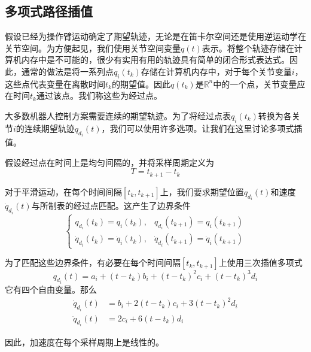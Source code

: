 \documentclass[UTF8]{ctexart}
\theoremstyle{definition}
\begin{document}
\subsection{多项式路径插值}

假设已经为操作臂运动确定了期望轨迹，无论是在笛卡尔空间还是使用逆运动学在关节空间。为方便起见，我们使用关节空间变量$q(t)$表示。将整个轨迹存储在计算机内存中是不可能的，很少有实用有用的轨迹具有简单的闭合形式表达式。因此，通常的做法是将一系列点$q_i(t_k)$存储在计算机内存中，对于每个关节变量$i$，这些点代表变量在离散时间$t_k$的期望值。因此$q(t_k)$是$\mathbb{R}^n$中的一个点，关节变量应在时间$t_k$通过该点。我们称这些为经过点。

大多数机器人控制方案需要连续的期望轨迹。为了将经过点表$q_i(t_k)$转换为各关节$i$的连续期望轨迹$q_{d_i}(t)$，我们可以使用许多选项。让我们在这里讨论多项式插值。

假设经过点在时间上是均匀间隔的，并将采样周期定义为
\begin{equation}\label{eq:4.2.1}
    T = t_{k+1} - t_k
\end{equation}

对于平滑运动，在每个时间间隔$[t_k, t_{k+1}]$上，我们要求期望位置$q_{d_i}(t)$和速度$\dot{q}_{d_i}(t)$与所制表的经过点匹配。这产生了边界条件
\begin{equation}\label{eq:4.2.2}
    \begin{cases}
        q_{d_i}(t_k) = q_i(t_k), & q_{d_i}(t_{k+1}) = q_i(t_{k+1}) \\
        \dot{q}_{d_i}(t_k) = \dot{q}_i(t_k), & \dot{q}_{d_i}(t_{k+1}) = \dot{q}_i(t_{k+1})
    \end{cases}
\end{equation}

为了匹配这些边界条件，有必要在每个时间间隔$[t_k, t_{k+1}]$上使用三次插值多项式
\begin{equation}\label{eq:4.2.3}
    q_{d_i}(t) = a_i + (t-t_k)b_i + (t-t_k)^2 c_i + (t-t_k)^3 d_i
\end{equation}
它有四个自由变量。那么
\begin{align}
    \dot{q}_{d_i}(t) &= b_i + 2(t-t_k)c_i + 3(t-t_k)^2 d_i \label{eq:4.2.4}\\
    \ddot{q}_{d_i}(t) &= 2c_i + 6(t-t_k) d_i \label{eq:4.2.5}
\end{align}

因此，加速度在每个采样周期上是线性的。
\end{document}
